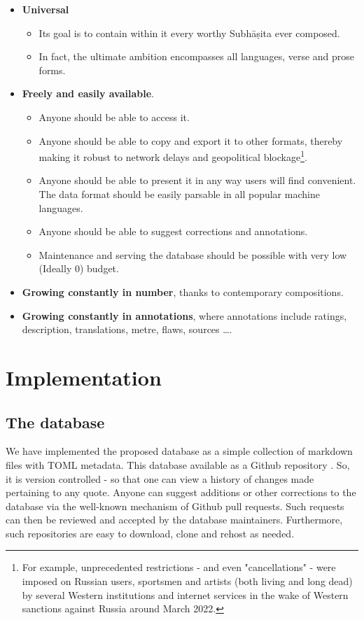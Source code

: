 \documentclass[11pt]{article}
\begin{document}
\begin{itemize}
\tightlist
\item
  \textbf{Universal}

  \begin{itemize}
  \tightlist
  \item
    Its goal is to contain within it every worthy Subhāṣita ever
    composed.
  \item
    In fact, the ultimate ambition encompasses all languages, verse
    and prose forms.
  \end{itemize}

\item
  \textbf{Freely and easily available}.

  \begin{itemize}
  \tightlist
  \item
     Anyone should be able to access it.
  \item
     Anyone should be able to copy and export it to other formats, thereby making it robust to network delays and geopolitical blockage\footnote{For example, unprecedented restrictions - and even "cancellations" - were imposed on Russian users, sportsmen and artists (both living and long dead) by several Western institutions and internet services in the wake of Western sanctions against Russia around March 2022.}. 
  \item
     Anyone should be able to present it in any way users will find convenient. The data format should be easily parsable in all popular machine languages.
  \item
     Anyone should be able to suggest corrections and annotations. 
  \item
     Maintenance and serving the database should be possible with very low (Ideally 0) budget. 
  \end{itemize}
\item
  \textbf{Growing constantly in number}, thanks to contemporary compositions.
\item
  \textbf{Growing constantly in annotations}, where annotations include ratings, description, translations, metre, flaws, sources \ldots.
\end{itemize}

\section{Implementation}
\subsection{The database}
We have implemented the proposed database as a simple collection of markdown files with TOML metadata. This database available as a Github repository \cite{subhaashita_db_sa_padya}. So, it is version controlled - so that one can view a history of changes made pertaining to any quote. Anyone can suggest additions or other corrections to the database via the well-known mechanism of Github pull requests. Such requests can then be reviewed and accepted by the database maintainers. Furthermore, such repositories are easy to download, clone and rehost as needed. 
\end{document}
